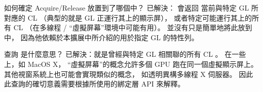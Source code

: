 \startQUESTION
{}如何確定 Acquire/Release 放置到了哪個中？
\stopQUESTION
\startANSWER
已解決：  會返回
當前與特定 GL 所對應的 CL 
（典型的就是 GL 正運行其上的顯示屏），
或者特定可能運行其上的所有 CL 
（在多線程 / “虛擬屏幕”環境中可能有用）。
並沒有只是簡單地將此放到中，
因為他依賴於本擴展中所介紹的用於指定 GL 的特性列。
\stopANSWER

\startQUESTION
查詢  是什麼意思？
\stopQUESTION
\startANSWER
已解決：就是曾經與特定 GL 相關聯的所有 CL 。
在一些上，如 MacOS X，
“虛擬屏幕”的概念允許多個 GPU 跑在同一個虛擬顯示屏上。
其他視窗系統上也可能會實現類似的概念，
如透明異構多線程 X 伺服器。
因此此查詢的確切意義需要根據所使用的綁定層 API 來解釋。
\stopANSWER


